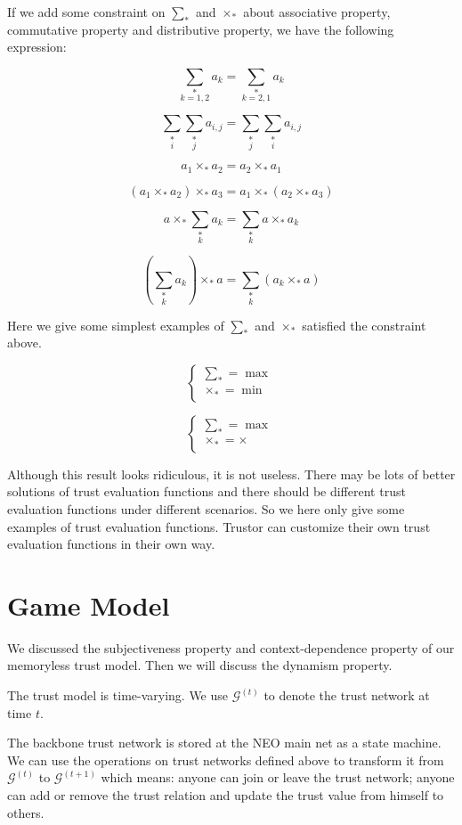 \documentclass{article}
\begin{document}
If we add some constraint on \(\sum _*\) and \(\times _*\) about associative property, commutative property and distributive property, we have the
following expression:

\[\underset{k=1,2}{\sum _*}a_k=\underset{k=2,1}{\sum _*}a_k\]

\[\underset{i}{\sum _*}\underset{j}{\sum _*}a_{i,j}=\underset{j}{\sum _*}\underset{i}{\sum _*}a_{i,j}\]

\[a_1\times _*a_2=a_2\times _*a_1\]

\[\left(a_1\times _*a_2\right)\times _*a_3=a_1\times _*\left(a_2\times _*a_3\right)\]

\[a\times _*\underset{k}{\sum _*}a_k=\underset{k}{\sum _*}a\times _*a_k\]

\[\left(\underset{k}{\sum _*}a_k\right)\times _*a=\underset{k}{\sum _*}\left(a_k\times _*a\right)\]

Here we give some simplest examples of { }\(\sum _*\) and \(\times _*\) satisfied the constraint above.

\[\left\{
\begin{array}{c}
 \sum _*=\max  \\
 \times _*=\min  \\
\end{array}
\right.\]

\[\left\{
\begin{array}{c}
 \sum _*=\max  \\
 \times _*=\times  \\
\end{array}
\right.\]

Although this result looks ridiculous, it is not useless. There may be lots of better solutions of trust evaluation functions and there should be
different trust evaluation functions under different scenarios. So we here only give some examples of trust evaluation functions. Trustor can customize
their own trust evaluation functions in their own way.


\section{Game Model}

We discussed the subjectiveness property and context-dependence property of our memoryless trust model. Then we will discuss the dynamism property.

The trust model is time-varying. We use \(\mathcal{G}^{(t)}\) to denote the trust network at time \(t\).

The backbone trust network is stored at the NEO main net as a state machine. We can use the operations on trust networks defined above to transform
it from \(\mathcal{G}^{(t)}\) to \(\mathcal{G}^{(t+1)}\) which means: anyone can join or leave the trust network; anyone can add or remove the trust
relation and update the trust value from himself to others.
\end{document}

